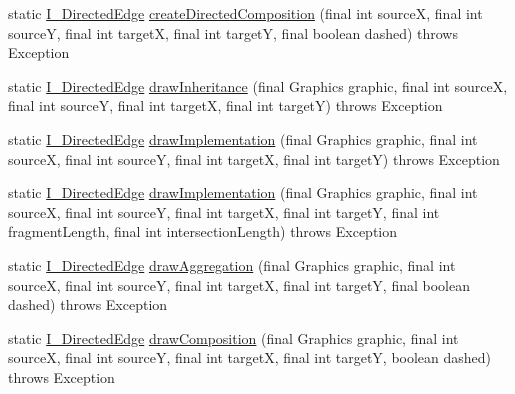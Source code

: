 \begin{DoxyCompactItemize}
\item 
static \hyperlink{interfaceorg_1_1tzi_1_1use_1_1gui_1_1views_1_1diagrams_1_1edges_1_1_i___directed_edge}{I\-\_\-\-Directed\-Edge} \hyperlink{classorg_1_1tzi_1_1use_1_1gui_1_1views_1_1diagrams_1_1edges_1_1_directed_edge_factory_aadefc8610faf0a4a24f5bc16128a2b4c}{create\-Directed\-Composition} (final int source\-X, final int source\-Y, final int target\-X, final int target\-Y, final boolean dashed)  throws Exception 
\item 
static \hyperlink{interfaceorg_1_1tzi_1_1use_1_1gui_1_1views_1_1diagrams_1_1edges_1_1_i___directed_edge}{I\-\_\-\-Directed\-Edge} \hyperlink{classorg_1_1tzi_1_1use_1_1gui_1_1views_1_1diagrams_1_1edges_1_1_directed_edge_factory_a3039460c878bc19dd8d3f08db2148714}{draw\-Inheritance} (final Graphics graphic, final int source\-X, final int source\-Y, final int target\-X, final int target\-Y)  throws Exception 
\item 
static \hyperlink{interfaceorg_1_1tzi_1_1use_1_1gui_1_1views_1_1diagrams_1_1edges_1_1_i___directed_edge}{I\-\_\-\-Directed\-Edge} \hyperlink{classorg_1_1tzi_1_1use_1_1gui_1_1views_1_1diagrams_1_1edges_1_1_directed_edge_factory_ad14c0c9f0e646b8c1620155a1f9ff007}{draw\-Implementation} (final Graphics graphic, final int source\-X, final int source\-Y, final int target\-X, final int target\-Y)  throws Exception 
\item 
static \hyperlink{interfaceorg_1_1tzi_1_1use_1_1gui_1_1views_1_1diagrams_1_1edges_1_1_i___directed_edge}{I\-\_\-\-Directed\-Edge} \hyperlink{classorg_1_1tzi_1_1use_1_1gui_1_1views_1_1diagrams_1_1edges_1_1_directed_edge_factory_a0d53e3b89333ac5cdbd4de3788b912e9}{draw\-Implementation} (final Graphics graphic, final int source\-X, final int source\-Y, final int target\-X, final int target\-Y, final int fragment\-Length, final int intersection\-Length)  throws Exception 
\item 
static \hyperlink{interfaceorg_1_1tzi_1_1use_1_1gui_1_1views_1_1diagrams_1_1edges_1_1_i___directed_edge}{I\-\_\-\-Directed\-Edge} \hyperlink{classorg_1_1tzi_1_1use_1_1gui_1_1views_1_1diagrams_1_1edges_1_1_directed_edge_factory_a28facad514e05de43bf1bb2af92a5fba}{draw\-Aggregation} (final Graphics graphic, final int source\-X, final int source\-Y, final int target\-X, final int target\-Y, final boolean dashed)  throws Exception 
\item 
static \hyperlink{interfaceorg_1_1tzi_1_1use_1_1gui_1_1views_1_1diagrams_1_1edges_1_1_i___directed_edge}{I\-\_\-\-Directed\-Edge} \hyperlink{classorg_1_1tzi_1_1use_1_1gui_1_1views_1_1diagrams_1_1edges_1_1_directed_edge_factory_ac109bba067840a69a072cd03f34f507e}{draw\-Composition} (final Graphics graphic, final int source\-X, final int source\-Y, final int target\-X, final int target\-Y, boolean dashed)  throws Exception 

\end{DoxyCompactItemize}
